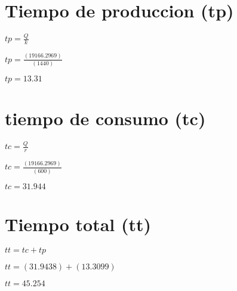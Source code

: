\documentclass{article}
\newcommand*\rbreak{\par\noindent\linebreak}
\begin{document}
\section{\Huge \Huge Tiempo de produccion (tp)}
\begin{huge}
$tp = \frac{Q}{k}$\rbreak
$tp = \frac{ (19166.2969) }{ (1440) }$\rbreak
$tp = 13.31$
\end{huge}
\section{\Huge \Huge tiempo de consumo (tc)}
\begin{huge}
$tc = \frac{Q}{r}$\rbreak
$tc = \frac{ (19166.2969) }{ (600) }$\rbreak
$tc = 31.944$
\end{huge}
\section{\Huge \Huge Tiempo total (tt)}
\begin{huge}
$tt = tc + tp$\rbreak
$tt =  (31.9438)  +  (13.3099) $\rbreak
$tt = 45.254$
\end{huge}
\end{document}

